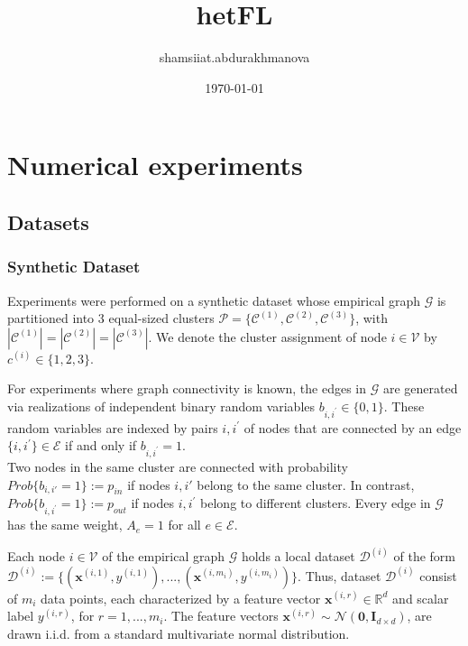 \documentclass{article}
\title{hetFL}
\author{shamsiiat.abdurakhmanova }
\date{\today}
\begin{document}
\maketitle

\section{Numerical experiments}

\subsection{Datasets}

\subsubsection{Synthetic Dataset}

Experiments were performed on a synthetic dataset whose empirical graph $\mathcal {G}$ is partitioned into 3 equal-sized clusters $\mathcal{P} = \{\mathcal{C}^{(1)}, \mathcal{C}^{(2)}, \mathcal{C}^{(3)}\}$, with $|\mathcal{C}^{(1)}|=|\mathcal{C}^{(2)}|=|\mathcal{C}^{(3)}|$. We denote the cluster assignment of node $i \in \mathcal{V}$ by ${c}^{(i)} \in \{1,2,3\}$. 

For experiments where graph connectivity is known, the edges in $\mathcal {G}$  are generated via realizations of independent binary random variables ${b}_{i,{i}^{'}} \in \{0,1\}$. These random variables are indexed by pairs $i,{i}^{'}$ of nodes that are connected by an edge $\{i,{i}^{'}\} \in \mathcal{E}$ if and only if ${b}_{i,{i}^{'}}=1$. \\
Two nodes in the same cluster are connected with probability $Prob\{{b}_{i,i'}=1\} :={p}_{in}$ if nodes $i,i'$ belong to the same cluster. In contrast, $Prob\{{b}_{i,{i}^{'}}=1\} :={p}_{out}$ if nodes $i,{i}^{'}$ belong to different clusters. Every edge in  $\mathcal {G}$ has the same weight, ${A}_{e}=1$ for all $e \in \mathcal{E}$.

Each node $i \in \mathcal {V}$ of the empirical graph $\mathcal {G}$ holds a local dataset $\mathcal {D}^{(i)}$ of the form $\mathcal {D}^{(i)} := \{ (\mathbf{x}^{(i,1)}, {y}^{(i,1)}), ..., (\mathbf{x}^{(i,{m}_{i})}, {y}^{(i,{m}_{i})}) \}$. Thus, dataset $\mathcal {D}^{(i)}$ consist of ${m}_{i}$ data points, each characterized by a feature vector $\mathbf{x}^{(i,r)} \in \mathbb{R}^{d}$ and scalar label ${y}^{(i,r)}$, for $r=1,...,{m}_{i}$. The feature vectors $\mathbf{x}^{(i,r)} \sim \mathcal{N}(\mathbf{0},\mathbf{I}_{d \times d})$, are drawn i.i.d. from a standard multivariate normal distribution. 
\end{document}
